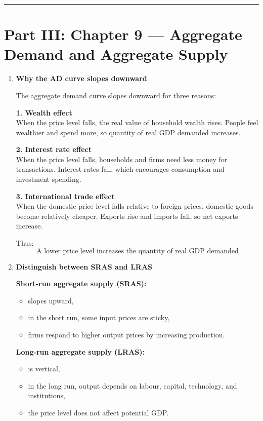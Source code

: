 \documentclass[12pt]{article}
\begin{document}
\hrule
\vspace{1em}

\section*{Part III: Chapter 9 — Aggregate Demand and Aggregate Supply}

\begin{enumerate}[label=\textbf{\arabic*.}, start=12]

\item \textbf{Why the AD curve slopes downward}

The aggregate demand curve slopes downward for three reasons:

\textbf{1. Wealth effect}\\
When the price level falls, the real value of household wealth rises. People feel wealthier and spend more, so quantity of real GDP demanded increases.

\textbf{2. Interest rate effect}\\
When the price level falls, households and firms need less money for transactions. Interest rates fall, which encourages consumption and investment spending.

\textbf{3. International trade effect}\\
When the domestic price level falls relative to foreign prices, domestic goods become relatively cheaper. Exports rise and imports fall, so net exports increase.

Thus:
\[
\boxed{\text{A lower price level increases the quantity of real GDP demanded}}
\]

\vspace{0.5em}

\item \textbf{Distinguish between SRAS and LRAS}

\textbf{Short-run aggregate supply (SRAS):}
\begin{itemize}
    \item slopes upward,
    \item in the short run, some input prices are sticky,
    \item firms respond to higher output prices by increasing production.
\end{itemize}

\textbf{Long-run aggregate supply (LRAS):}
\begin{itemize}
    \item is vertical,
    \item in the long run, output depends on labour, capital, technology, and institutions,
    \item the price level does not affect potential GDP.
\end{itemize}


\end{enumerate}
\end{document}
